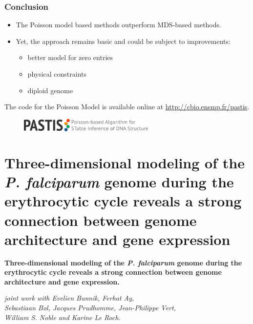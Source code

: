 \documentclass[xcolor=dvipsnames]{beamer}
\begin{document}
\begin{frame}
\frametitle{Conclusion}
\begin{itemize}[label={$\bullet$}]

\item The Poisson model based methods outperform MDS-based methods.
\item Yet, the approach remains basic and could be subject to improvements:
  \begin{itemize}[label={$\bullet$}]

    \item better model for zero entries
    \item physical constraints
    \item diploid genome
  \end{itemize}
\end{itemize}

\vspace{3em}
{\footnotesize
The code for the Poisson Model is available online at
\url{http://cbio.ensmp.fr/pastis}.
}
\begin{figure}
\includegraphics[width=0.6\textwidth]{figures/pastis_logo.png}
\end{figure}
\end{frame}

\section{Three-dimensional modeling of the {\em P. falciparum} genome
during the erythrocytic cycle reveals a strong connection between genome
architecture and gene expression}

\begin{frame}

\Large{ \bf
Three-dimensional modeling of the \textit{P. falciparum} genome
during the erythrocytic cycle reveals a strong connection between genome
architecture and gene expression.}

\begin{flushright}
\vspace{1em}
\small
\textit{joint work with 
Evelien Bunnik, Ferhat Ay, \\
Sebastiaan Bol, Jacques Prudhomme, Jean-Philippe Vert, \\ William S. Noble and Karine
Le Roch.}
\end{flushright}

\end{frame}
\end{document}
